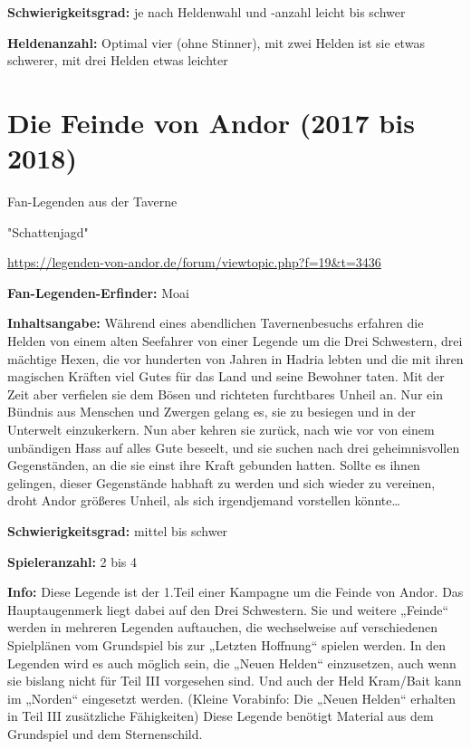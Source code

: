 {\textbf{Schwierigkeitsgrad:} je nach Heldenwahl und -anzahl leicht bis schwer

\textbf{Heldenanzahl:} Optimal vier (ohne Stinner), mit zwei Helden ist sie etwas schwerer, mit drei Helden etwas leichter




\newpage
\section{Die Feinde von Andor (2017 bis 2018)}


\begin{center}
    Fan-Legenden aus der Taverne

    "Schattenjagd"

    \url{https://legenden-von-andor.de/forum/viewtopic.php?f=19&t=3436}
\end{center}



\textbf{Fan-Legenden-Erfinder:} Moai

\textbf{Inhaltsangabe:}
Während eines abendlichen Tavernenbesuchs erfahren die Helden von einem alten Seefahrer von einer Legende um die Drei Schwestern, drei mächtige Hexen, die vor hunderten von Jahren in Hadria lebten und die mit ihren magischen Kräften viel Gutes für das Land und seine Bewohner taten. Mit der Zeit aber verfielen sie dem Bösen und richteten furchtbares Unheil an. Nur ein Bündnis aus Menschen und Zwergen gelang es, sie zu besiegen und in der Unterwelt einzukerkern. Nun aber kehren sie zurück, nach wie vor von einem unbändigen Hass auf alles Gute beseelt, und sie suchen nach drei geheimnisvollen Gegenständen, an die sie einst ihre Kraft gebunden hatten. Sollte es ihnen gelingen, dieser Gegenstände habhaft zu werden und sich wieder zu vereinen, droht Andor größeres Unheil, als sich irgendjemand vorstellen könnte…

\textbf{Schwierigkeitsgrad:} mittel bis schwer

\textbf{Spieleranzahl:} 2 bis 4

\textbf{Info:}
Diese Legende ist der 1.Teil einer Kampagne um die Feinde von Andor. Das Hauptaugenmerk liegt dabei auf den Drei Schwestern. Sie und weitere „Feinde“ werden in mehreren Legenden auftauchen, die wechselweise auf verschiedenen Spielplänen vom Grundspiel bis zur „Letzten Hoffnung“ spielen werden. In den Legenden wird es auch möglich sein, die „Neuen Helden“ einzusetzen, auch wenn sie bislang nicht für Teil III vorgesehen sind. Und auch der Held Kram/Bait kann im „Norden“ eingesetzt werden. (Kleine Vorabinfo: Die „Neuen Helden“ erhalten in Teil III zusätzliche Fähigkeiten)
Diese Legende benötigt Material aus dem Grundspiel und dem Sternenschild.




}
